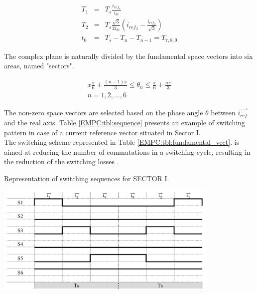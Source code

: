     \begin{equation}
        \begin{array}{rcl}
            T_1&=&T_s\frac{i_{ref_\alpha}}{i_{dc}}\\
            T_2&=&T_s\frac{\sqrt{3}}{2i_{dc}}(i_{ref_\beta}-\frac{i_{ref_\alpha}}{\sqrt{3}})\\
            t_0&=&T_s-T_n-T_{n-1}=T_{7,8,9}
        \end{array}
        \label{EMPC:equ:dwelltime}
    \end{equation}

    The complex plane is naturally divided by the fundamental space vectors into six areas, named "sectors".

    \begin{equation}
        \begin{array}{l}
            x\frac{\pi}{6}+\frac{(n-1)\pi}{3}\leq\theta_n\leq\frac{\pi}{6}+\frac{n\pi}{3}\\
            n=1,2,\dots,6
        \end{array}
        \label{EMPC:equ:angle}
    \end{equation}

    The non-zero space vectors are selected based on the phase angle $\theta$ between $\overrightarrow{i_{ref}}$ and the real axis.
    Table \ref{EMPC:tbl:sequence} presents an example of switching pattern in case of a current reference vector situated in Sector I.\\
    The switching scheme represented in Table \ref{EMPC:tbl:fundamental_vect}. is aimed at reducing the number of commutations in a switching cycle, resulting in the reduction of the switching losses \cite{moussaoui2005open}.\\

    \begin{table}[h]
		\caption{Representation of switching sequences for SECTOR I.}
		\centering
        \includegraphics[width=0.8\textwidth]{EMPC_PNG_Pics/Sequence.png}
        \label{EMPC:tbl:sequence}
    \end{table}


